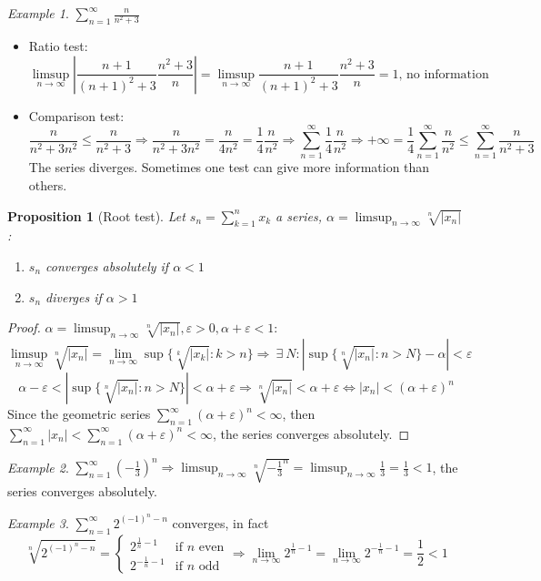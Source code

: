 \documentclass{article}
\newcommand{\DS}{\displaystyle}
\newcommand{\abs}[1]{\left|#1\right|}
\newcommand{\Ar}{\Rightarrow}
\newenvironment{enumrom}{\begin{enumerate}[label=(\roman*)]}{\end{enumerate}}
\newcommand{\fr}[2]{\frac{#1}{#2}}
\newcommand{\limn}{\lim_{n \to \infty}}
\newcommand{\limsupn}{\limsup_{n \to \infty}}
\theoremstyle{definition}
\theoremstyle{definition}
\theoremstyle{plain}
\theoremstyle{plain}
\theoremstyle{plain}
\theoremstyle{plain}
\newtheorem{proposition}[theorem]{Proposition}
\theoremstyle{definition}
\theoremstyle{remark}
\theoremstyle{remark}
\theoremstyle{remark}
\newtheorem{examplet}{Example}[theorem]
\theoremstyle{remark}
\newcommand{\sumn}{\sum_{k=1}^n}
\newcommand{\series}{\sum_{n=1}^\infty}
\newcommand{\Exists}{\ \exists \ }
\newcommand{\E}{\varepsilon}
\begin{document}
\begin{examplet}
  $\DS \series \fr{n}{n^2+3}$
  \begin{itemize}
  \item Ratio test:
    \[
    \limsupn \abs{\fr{n+1}{(n+1)^2+3}\fr{n^2+3}{n}} =
    \limsupn \fr{n+1}{(n+1)^2+3}\fr{n^2+3}{n} = 1 \text{, no information}
    \]
  \item Comparison test:
    \[
    \fr{n}{n^2+3n^2} \leq \fr{n}{n^2+3} \Ar
    \fr{n}{n^2+3n^2} = \fr{n}{4n^2} = \fr{1}{4} \fr{n}{n^2}
    \Ar \series \fr{1}{4} \fr{n}{n^2} \Ar
    + \infty = \fr{1}{4} \series \fr{n}{n^2} \leq \series \fr{n}{n^2+3}
    \]
    The series diverges. Sometimes one test can give more information than others.
  \end{itemize}
\end{examplet}


\begin{proposition}[Root test]
  Let $\DS s_n = \sumn{x_k}$ a series, $\DS \alpha = \limsupn \sqrt[n]{\abs{x_n}}$:
  \begin{enumrom}
    \item $s_n$ converges absolutely if $\alpha < 1$
    \item $s_n$ diverges if $\alpha > 1$
  \end{enumrom}
\end{proposition}

\begin{proof}
  $\alpha = \limsupn \sqrt[n]{\abs{x_n}}, \E > 0, \alpha + \E < 1$:
  \[
    \limsupn \sqrt[n]{\abs{x_n}} = \limn \sup\{\sqrt[k]{\abs{x_k}} : k > n\}
    \Ar \Exists N : \abs{\sup\{\sqrt[n]{\abs{x_n}} : n > N\} - \alpha} <
    \E
  \]
  \[
    \alpha - \E < \abs{\sup\{\sqrt[n]{\abs{x_n}} : n > N\}} < \alpha + \E
    \Ar \sqrt[n]{\abs{x_n}} < \alpha + \E \iff
    \abs{x_n} < (\alpha + \E)^n
  \]
  Since the geometric series $\DS \series (\alpha + \E)^n < \infty$, then $\DS \series \abs{x_n} < \series (\alpha + \E)^n < \infty$, the series converges absolutely.
\end{proof}

\begin{examplet}
  $\DS \series\left({-\frac{1}{3}}\right)^n \Ar \limsupn \sqrt[n]{-\frac{1}{3}^n} = \limsupn \frac{1}{3} = \frac{1}{3} < 1$, the series converges absolutely.
\end{examplet}

\begin{examplet}
  $\DS \series 2^{(-1)^n-n}$ converges, in fact
  \[
  \sqrt[n]{2^{(-1)^n-n}} =
  \begin{cases}
    2^{\frac{1}{n}-1}  & \text{if } n \text{ even} \\
    2^{-\frac{1}{n}-1} & \text{if } n \text{ odd}
  \end{cases} \Ar
  \limn 2^{\frac{1}{n}-1} = \limn 2^{-\frac{1}{n}-1} = \frac{1}{2} < 1
  \]
\end{examplet}
\end{document}
